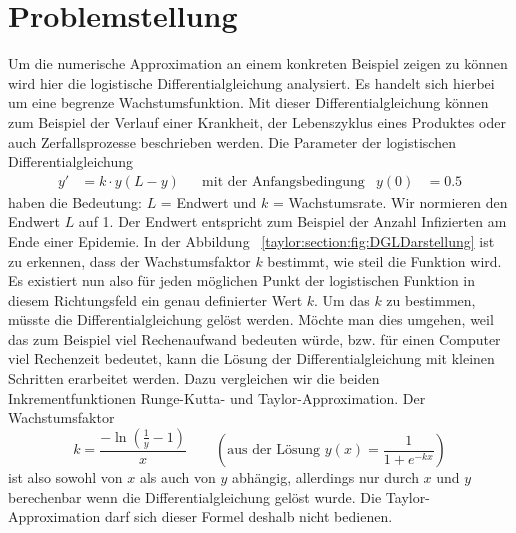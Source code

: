 %
%
%
\section{Problemstellung
\label{taylor:section:problemstellung}}
Um die numerische Approximation an einem konkreten Beispiel zeigen zu können wird hier die logistische Differentialgleichung analysiert.
Es handelt sich hierbei um eine begrenze Wachstumsfunktion. 
Mit dieser Differentialgleichung können zum Beispiel der Verlauf einer Krankheit, der Lebenszyklus eines Produktes oder auch Zerfallsprozesse beschrieben werden. Die Parameter der logistischen Differentialgleichung 
\begin{align*}
	y' &= k\cdot y(L-y) 
	&&\text{mit der Anfangsbedingung}
	&y(0) &= 0.5
	\label{taylor:section:logistifunction}
\end{align*}
haben die Bedeutung: $L$ = Endwert und $k$ = Wachstumsrate.
Wir normieren den Endwert $L$ auf 1.
Der Endwert entspricht zum Beispiel der Anzahl Infizierten am Ende einer Epidemie.
%
%
In der Abbildung ~\ref{taylor:section:fig:DGLDarstellung} ist zu erkennen, dass der Wachstumsfaktor $k$ bestimmt, wie steil die Funktion wird.
Es existiert nun also für jeden möglichen Punkt der logistischen Funktion in diesem Richtungsfeld ein genau definierter Wert $k$.
Um das $k$ zu bestimmen, müsste die Differentialgleichung gelöst werden.
Möchte man dies umgehen, weil das zum Beispiel viel Rechenaufwand bedeuten würde, bzw. für einen Computer viel Rechenzeit bedeutet, kann die Lösung der Differentialgleichung mit kleinen Schritten erarbeitet werden.
Dazu vergleichen wir die beiden Inkrementfunktionen Runge-Kutta- und Taylor-Approximation.
%
%
Der Wachstumsfaktor
%
\begin{equation}
k=\frac{-\ln{(\frac{1}{y}-1)}}{x}
\qquad
\left(\text{aus der Lösung $y(x)=\displaystyle\frac1{1+e^{-kx}}$}\right)
\end{equation}
ist also sowohl von $x$ als auch von $y$ abhängig, allerdings nur durch $x$ und $y$ berechenbar wenn die Differentialgleichung gelöst wurde.
Die Taylor-Approximation darf sich dieser Formel deshalb nicht bedienen.

